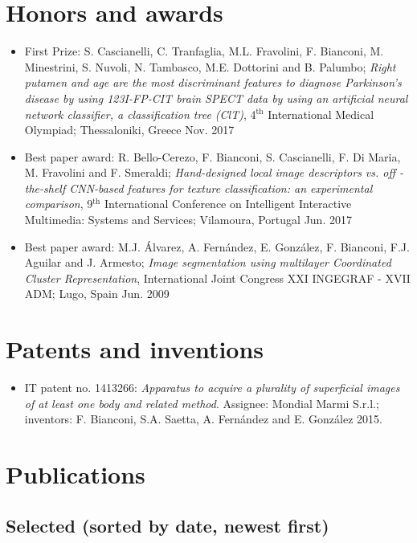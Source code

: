 \documentclass[11pt]{article}
\begin{document}
\section*{Honors and awards}

\begin{itemize}
  \item First Prize: S. Cascianelli, C. Tranfaglia, M.L. Fravolini, F. Bianconi, M. Minestrini, S. Nuvoli, N. Tambasco, M.E. Dottorini and B. Palumbo; \emph{Right putamen and age are the most discriminant features to diagnose Parkinson's disease by using 123I-FP-CIT brain SPECT data by using an artificial neural network classifier, a classification tree (ClT)}, 4$^\text{th}$ International Medical Olympiad; Thessaloniki, Greece \hfill Nov. 2017
	\item Best paper award: R. Bello-Cerezo, F. Bianconi, S. Cascianelli, F. Di Maria, M. Fravolini and F. Smeraldi; \emph{Hand-designed local image descriptors vs. off -the-shelf CNN-based features for texture classification: an experimental comparison}, 9$^\text{th}$ International Conference on Intelligent Interactive Multimedia: Systems and Services; Vilamoura, Portugal \hfill Jun. 2017
	\item Best paper award: M.J. Álvarez, A. Fernández, E. González, F. Bianconi, F.J. Aguilar and J. Armesto; \emph{Image segmentation using multilayer Coordinated Cluster Representation}, International Joint Congress XXI INGEGRAF - XVII ADM; Lugo, Spain \hfill Jun. 2009
\end{itemize}

\section*{Patents and inventions}

\begin{itemize}
	\item IT patent no. 1413266: \emph{Apparatus to acquire a plurality of superficial images of at least one body and related method}. Assignee: Mondial Marmi S.r.l.; inventors: F. Bianconi, S.A. Saetta, A. Fernández and E. González \hfill 2015.
\end{itemize}

\section*{Publications} 

\subsection*{Selected (sorted by date, newest first)}
\end{document}
